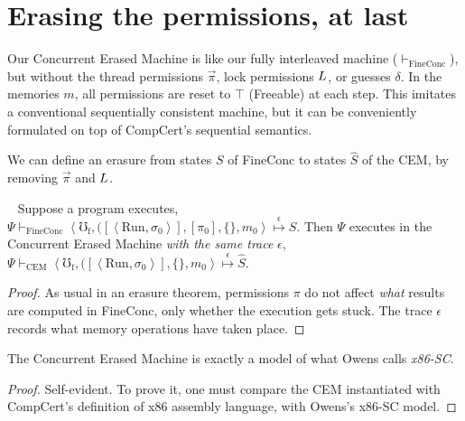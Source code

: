 \begin{comment}
We state these very reasonable conjectures here to motivate
our main theorem.
That is, \autoref{thm:mainresult} guarantees that
every sequentially-consistent-interleaved execution
of the machine-language program obeys the rules
of the Concurrent Permission Machine.  Intuitively that
guarantees race freedom.  More technically, we expect that
it guarantees \emph{release-acquire well-synchronized},
and therefore that any observable behavior on the weakly
consistent machine is equivalent to some behavior on a
(hypothetical) SC machine.  And therefore, by
\autoref{thm:mainresult}, all behaviors obey the
source-level specification in Concurrent Separation Logic.
\end{comment}

\section{Erasing the permissions, at last}
\label{sec:x86sc}
Our Concurrent Erased Machine is like our fully interleaved machine
($\vdash_\mathrm{FineConc}$), but without the thread permissions
$\vec{\pi}$, lock permissions $L$, or guesses $\delta$.  In
the memories $m$, all permissions are reset to $\top$ (Freeable) at
each step. This imitates a conventional sequentially consistent
machine, but it can be conveniently formulated on top of
CompCert's sequential semantics.

We can define an erasure from states $S$ of FineConc
to states $\hat{S}$ of the CEM, by removing
$\vec{\pi}$ and $L$.

\begin{theorem}
\label{thm:erasure-x86SC}
~ \newline
Suppose a program executes, 
$  
\Psi \vdash_\mathrm{FineConc}
\left<\mho_\mathrm{f},
([\left<\mathrm{Run},\sigma_0\right>],[\pi_0], \{\}, m_0\right>
\stackrel{\epsilon}\mapsto S$.
Then $\Psi$ executes
in the Concurrent Erased Machine \emph{with the same trace} $\epsilon$,\quad
$  
\Psi \vdash_\mathrm{CEM}
\left<\mho_\mathrm{f},
([\left<\mathrm{Run},\sigma_0\right>],\{\}, m_0\right>
\stackrel{\epsilon}\mapsto \hat{S}$.
\end{theorem}
\begin{proof}
  As usual in an erasure theorem,
  permissions $\pi$ do not affect
  \emph{what} results are computed in FineConc,
  only whether the execution gets stuck.
  The trace $\epsilon$ records what memory operations have taken place.
\end{proof}

\begin{claim}[x86-SC]\label{claim:owens}
  The Concurrent Erased Machine is exactly a model of what Owens
  calls \emph{x86-SC}.
\end{claim}
\begin{proof}Self-evident.  To prove it, one must compare
  the CEM instantiated with CompCert's definition of x86 assembly
  language, with Owens's x86-SC model.
\end{proof}